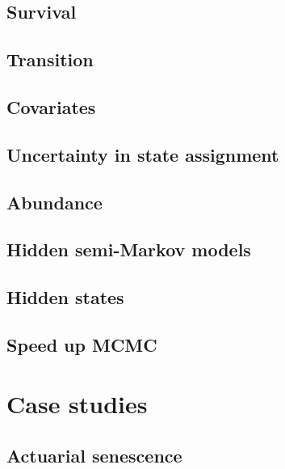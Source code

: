 \documentclass[
  12pt,
]{krantz}
\begin{document}
\hypertarget{survival}{%
\chapter{Survival}\label{survival}}

\hypertarget{transition}{%
\chapter{Transition}\label{transition}}

\hypertarget{covariates}{%
\chapter{Covariates}\label{covariates}}

\hypertarget{uncertainty}{%
\chapter{Uncertainty in state assignment}\label{uncertainty}}

\hypertarget{abundance}{%
\chapter{Abundance}\label{abundance}}

\hypertarget{hsmm}{%
\chapter{Hidden semi-Markov models}\label{hsmm}}

\hypertarget{states}{%
\chapter{Hidden states}\label{states}}

\hypertarget{speed}{%
\chapter{Speed up MCMC}\label{speed}}

\hypertarget{part-case-studies}{%
\part{Case studies}\label{part-case-studies}}

\hypertarget{senescence}{%
\chapter{Actuarial senescence}\label{senescence}}
\end{document}
